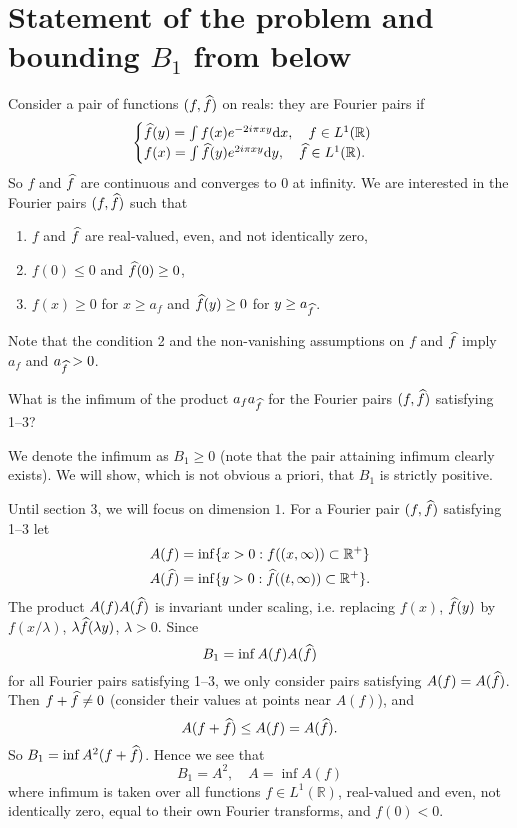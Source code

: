 \section{Statement of the problem and bounding $B_{1}$ from below}

Consider a pair of functions $(f, \widehat{f})$ on reals: they are Fourier pairs if
\[
    \begin{cases}
    \widehat{f}(y) = \int f(x) e^{-2 i \pi x y} \mathrm{d} x, \quad f \in L^{1}(\mathbb{R}) \\
    f(x) = \int \widehat{f}(y) e^{2 i \pi x y} \mathrm{d} y, \quad \widehat{f} \in L^{1}(\mathbb{R}).
    \end{cases}
\]
So $f$ and $\widehat{f}$ are continuous and converges to $0$ at infinity.
We are interested in the Fourier pairs $(f, \widehat{f})$ such that
\begin{enumerate}
    \item $f$ and $\widehat{f}$ are real-valued, even, and not identically zero,
    \item $f(0) \leq 0$ and $\widehat{f}(0) \geq 0$,
    \item $f(x) \geq 0$ for $x \geq a_f$ and $\widehat{f}(y) \geq 0$ for $y \geq a_{\widehat{f}}$.
\end{enumerate}
Note that the condition 2 and the non-vanishing assumptions on $f$ and $\widehat{f}$ imply $a_f$ and $a_{\widehat{f}} > 0$.

\begin{problem*}
What is the infimum of the product $a_{f} a_{\widehat{f}}$ for the Fourier pairs $(f, \widehat{f})$ satisfying 1--3?
\end{problem*}

We denote the infimum as $B_1 \geq 0$ (note that the pair attaining infimum clearly exists).
We will show, which is not obvious a priori, that $B_1$ is strictly positive.

Until section 3, we will focus on dimension $1$.
For a Fourier pair $(f, \widehat{f})$ satisfying 1--3 let
\begin{align*}
    A(f) &= \inf\{x > 0: f((x, \infty)) \subset \mathbb{R}^{+}\} \\
    A(\widehat{f}) &= \inf\{y > 0: \widehat{f}((t, \infty)) \subset \mathbb{R}^{+}\} .
\end{align*}
The product $A(f)A(\widehat{f})$ is invariant under scaling, i.e. replacing $f(x)$, $\widehat{f}(y)$ by $f(x /\lambda)$, $\lambda \widehat{f}(\lambda y)$, $\lambda > 0$.
Since
\[
    B_1 = \inf A(f) A(\widehat{f})
\]
for all Fourier pairs satisfying 1--3, we only consider pairs satisfying $A(f) = A(\widehat{f})$.
Then $f + \widehat{f} \neq 0$ (consider their values at points near $A(f)$), and
\[
    A(f + \widehat{f}) \leq A(f) = A(\widehat{f}).
\]
So $B_1 = \inf A^{2}(f + \widehat{f})$. Hence we see that
\[
    B_1 = A^2, \quad A = \inf A(f)
\]
where infimum is taken over all functions $f \in L^{1}(\mathbb{R})$, real-valued and even, not identically zero, equal to their own Fourier transforms, and $f(0) < 0$.

